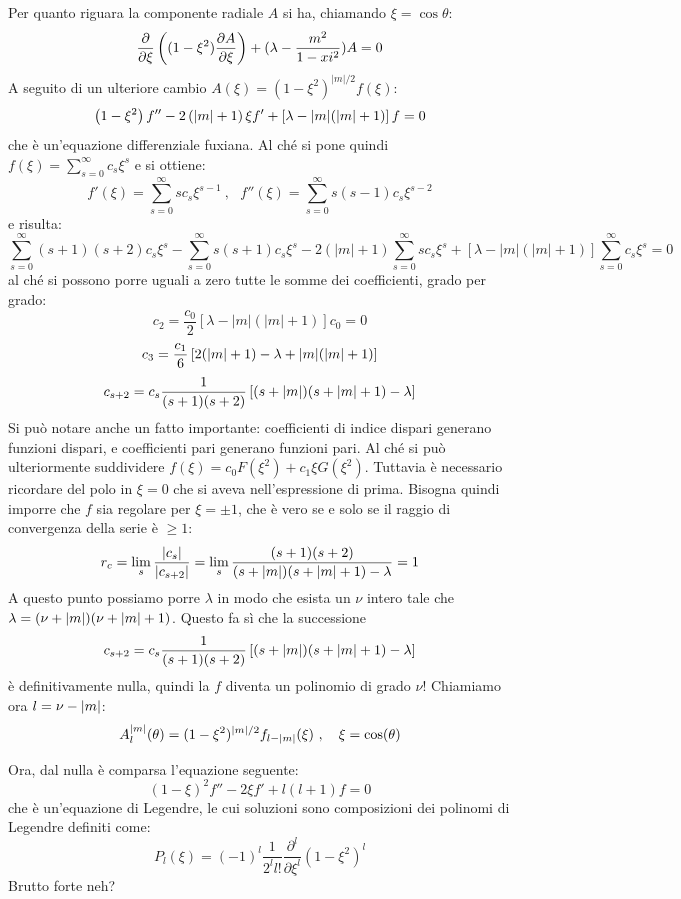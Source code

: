 Per quanto riguara la componente radiale $A$ si ha, chiamando $\xi = \cos\theta$:
\[
\deriv[\xi]{} \l (1-\xi^2)\deriv[\xi]{A} \r + (\lambda - \frac{m^2}{1-xi^2})A=0
\]
A seguito di un ulteriore cambio $A(\xi) = (1-\xi^2)^{|m|/2}f(\xi)$:
\[
\l 1-\xi^2 \r f'' - 2 \l |m| + 1 \r \xi f' + \left[ \lambda - |m|(|m| + 1) \right] f = 0
\]
che è un'equazione differenziale fuxiana. Al ché si pone quindi $f(\xi) = \sum_{s = 0}^{\infty} c_s\xi^s$ e si ottiene:
\[
    f'(\xi) = \sum_{s = 0}^{\infty} sc_s\xi^{s-1}\ ,\ \ \ f''(\xi) = \sum_{s = 0}^{\infty} s(s-1)c_s\xi^{s-2}
\]
e risulta:
\[
    \sum_{s = 0}^{\infty} (s+1)(s+2)c_s\xi^{s} - \sum_{s = 0}^{\infty} s(s+1)c_s\xi^s-2(|m| + 1) \sum_{s = 0}^{\infty} sc_s\xi^s + \left[ \lambda - |m| (|m| + 1) \right] \sum_{s = 0}^{\infty} c_s\xi^s = 0
\]
al ché si possono porre uguali a zero tutte le somme dei coefficienti, grado per grado:
\[
    c_2 = \frac{c_0}{2} \left[ \lambda - |m|(|m| + 1) \right]c_0 = 0 \] \[
    c_3 = \frac{c_1}{6}\left[ 2(\abs m + 1) - \lambda + \abs m (\abs m + 1) \right] \]\[
    c_{s+2} = c_s \frac{1}{(s+1)(s+2)} \left[ (s+\abs m) (s + \abs m + 1) - \lambda \right]
\]
Si può notare anche un fatto importante: coefficienti di indice dispari generano funzioni dispari, e coefficienti pari generano funzioni pari. Al ché si può ulteriormente suddividere $f(\xi) = c_0 F(\xi^2) + c_1 \xi G(\xi^2)$. Tuttavia è necessario ricordare del polo in $\xi = 0$ che si aveva nell'espressione di prima. Bisogna quindi imporre che $f$ sia regolare per $\xi = \pm 1$, che è vero se e solo se il raggio di convergenza della serie è $\geq 1$:
\[
    r_c = \lim_s \frac{\abs{c_s}}{\abs{c_{s+2}}} = \lim_s \frac{(s+1)(s+2)}{(s+\abs m)(s + \abs m + 1) - \lambda} = 1
\]
A questo punto possiamo porre $\lambda$ in modo che esista un $\nu$ intero tale che $\lambda = (\nu + \abs m)(\nu + \abs m + 1)$. Questo fa sì che la successione
\[
c_{s+2} = c_s \frac{1}{(s+1)(s+2)} \left[ (s+\abs m) (s + \abs m + 1) - \lambda \right]
\]
è definitivamente nulla, quindi la $f$ diventa un polinomio di grado $\nu$! Chiamiamo ora $l = \nu - \abs m$:
\[
    A_l^{|m|} (\theta) = (1 - \xi^2)^{|m|/2}f_{l-\abs m}(\xi)\ ,\ \ \ \xi = \cos(\theta)
\]




Ora, dal nulla è comparsa l'equazione seguente:
\[
    (1-\xi)^2f'' - 2 \xi f' + l(l+1)f = 0
\]
che è un'equazione di Legendre, le cui soluzioni sono composizioni dei polinomi di Legendre definiti come:
\[
    P_l(\xi) = (-1)^l\frac{1}{2^l l!} \frac{\partial^l}{\partial \xi^l}(1-\xi^2)^l
\]
Brutto forte neh?


